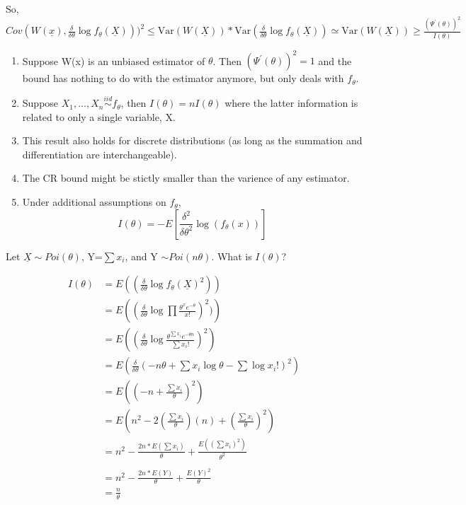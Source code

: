 \documentclass[11pt,fleqn]{book} %
\begin{document}
	So, \\
	$Cov(W(\underline{x}), \frac{\delta}{\delta\theta}\log f_\theta(\underline{X})))^2 \le \text{Var}(W(\underline{X}))*\text{Var}(\frac{\delta}{\delta\theta}\log f_\theta(\underline{X})) \simeq \text{Var}(W(\underline{X})) \ge \frac{(\Psi^\prime(\theta))^2}{I(\theta)}$

	\begin{remark}
		\begin{enumerate}[label = (\roman*)]
			\item Suppose W(x) is an unbiased estimator of $\theta$. Then $(\Psi^\prime(\theta))^2 = 1$ and the bound has nothing to do with the estimator anymore, but only deals with $f_\theta$.
			\item Suppose $X_1, \dots, X_n \stackrel{iid}{\sim} f_\theta$, then $I(\theta) = nI(\theta)$ where the latter information is related to only a single variable, X.
			\item This result also holds for discrete distributions (as long as the summation and differentiation are interchangeable).
			\item The CR bound might be stictly smaller than the varience of any estimator.
			\item Under additional assumptions on $f_\theta$, 
			$$I(\theta) = -E\left[\frac{\delta^2}{\delta \theta^2} \log(f_\theta(x))\right] $$ 
		\end{enumerate}
	\end{remark}

	\begin{exercise}
		Let $\underline{X} \sim Poi(\theta)$, Y=$\sum x_i$, and Y $\sim Poi(n\theta)$. What is $I(\theta)$?

		\begin{align*}
			I(\theta) &= E\left((\frac{\delta}{\delta \theta}\log f_\theta(\underline{X})^2) \right)\\
					&=E\left((\frac{\delta}{\delta \theta}\log \prod \frac{\theta^x e^{-\theta}}{x!})^2) \right)\\
					&= E\left((\frac{\delta}{\delta \theta}\log \frac{\theta^{\sum x_i} e^{-\theta n}}{\sum x_i!})^2 \right)\\
					&= E\left(\frac{\delta}{\delta \theta}(-n\theta + \sum x_i \log \theta - \sum \log x_i!)^2  \right)\\
					&= E\left((-n+\frac{\sum x_i}{\theta})^2 \right)\\
					&= E\left( n^2 - 2(\frac{\sum x_i}{\theta})(n)+(\frac{\sum x_i}{\theta})^2 \right)\\
					&= n^2 -\frac{2n * E(\sum x_i)}{\theta} + \frac{E((\sum x_i)^2)}{\theta^2}\\
					\\
					&=n^2 - \frac{2n*E(Y)}{\theta} + \frac{E(Y)^2}{\theta}\\
					&=\frac{n}{\theta}
		\end{align*}
	\end{exercise}
\end{document}
